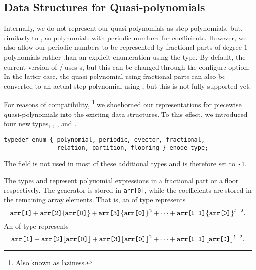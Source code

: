 \subsection{Data Structures for Quasi-polynomials}
\label{a:data}

Internally, we do not represent our quasi-polynomials
as step-polynomials, but, similarly to ,
as polynomials with periodic numbers for coefficients.
However, we also allow our periodic numbers to be represented by
fractional parts of degree-$1$ polynomials rather than
an explicit enumeration using the  type.
By default, the current version of \barvinok/ uses
s, but this can be changed through
the  configure option.
In the latter case, the quasi-polynomial using fractional
parts can also be converted to an actual step-polynomial
using , but this is not fully
supported yet.

For reasons of compatibility,%
\footnote{Also known as laziness.}
we shoehorned our representations for piecewise quasi-polynomials
into the existing data structures.
To this effect, we introduced four new types,
, ,
 and .
\begin{verbatim}
typedef enum { polynomial, periodic, evector, fractional,
               relation, partition, flooring } enode_type;
\end{verbatim}
The field  is not used in most of these
additional types and is therefore set to \verb+-1+.

The types  and 
represent polynomial expressions in a fractional part or a floor respectively.
The generator is stored in \verb+arr[0]+, while the
coefficients are stored in the remaining array elements.
That is, an  of type 
represents
$$
\verb+arr[1]+ + \verb+arr[2]+ \{\verb+arr[0]+\} + 
\verb+arr[3]+ \{\verb+arr[0]+\}^2 + \cdots +
\verb+arr[l-1]+ \{\verb+arr[0]+\}^{l-2}
.
$$
An  of type 
represents
$$
\verb+arr[1]+ + \verb+arr[2]+ \lfloor\verb+arr[0]+\rfloor + 
\verb+arr[3]+ \lfloor\verb+arr[0]+\rfloor^2 + \cdots +
\verb+arr[l-1]+ \lfloor\verb+arr[0]+\rfloor^{l-2}
.
$$

